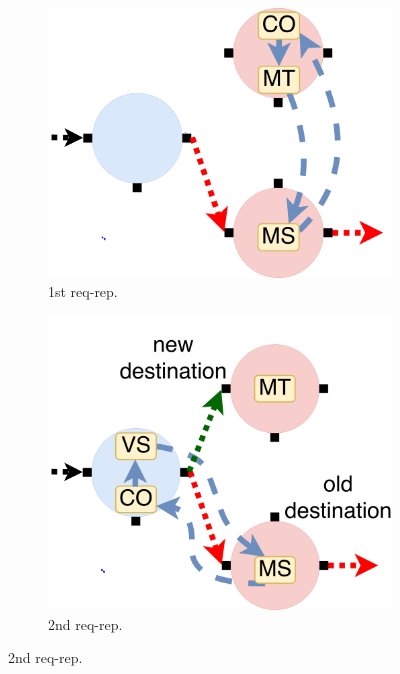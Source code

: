 \begin{figure}[!h]
\begin{subfigure}[t]{0.33\linewidth}
   \centering
   \includegraphics[width=\columnwidth]{figure/nfactor-mig1.pdf}
   \caption{1st req-rep.}\label{fig:mig1}
  \end{subfigure}\hfill
  \begin{subfigure}[t]{0.33\linewidth}
     \centering
     \includegraphics[width=\columnwidth]{figure/nfactor-mig2.pdf}
     \caption{2nd req-rep.}\label{fig:mig2}
    \end{subfigure}\hfill

\end{figure}
